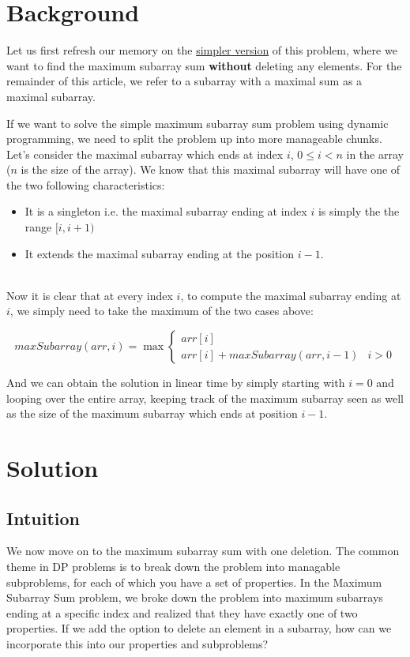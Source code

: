\documentclass{bmcart}
\begin{document}
\section{Background}
Let us first refresh our memory on the \href{https://leetcode.com/problems/maximum-subarray/}{simpler version} of this problem, where we want to find the maximum subarray sum \textbf{without} deleting any elements. For the remainder of this article, we refer to a subarray with a maximal sum as a maximal subarray.

 If we want to solve the simple maximum subarray sum problem using dynamic programming, we need to split the problem up into more manageable chunks. Let's consider the maximal subarray which ends at index $i$, $0 \leq i < n$ in the array ($n$ is the size of the array). We know that this maximal subarray will have one of the two following characteristics:

\begin{itemize}
	\item It is a singleton i.e. the maximal subarray ending at index $i$ is simply the the range $[i, i+1)$
	\item It extends the maximal subarray ending at the position $i-1$. 
\end{itemize}
\ \\
Now it is clear that at every index $i$, to compute the maximal subarray ending at $i$, we simply need to take the maximum of the two cases above: 

\[ maxSubarray(arr, i) = \max{\begin{cases} 
arr[i]\\
arr[i] + maxSubarray(arr, i - 1) & i > 0
\end{cases}}
\]

And we can obtain the solution in linear time by simply starting with $i=0$ and looping over the entire array, keeping track of the maximum subarray seen as well as the size of the maximum subarray which ends at position $i-1$. 




\section{Solution}
\subsection{Intuition}
We now move on to the maximum subarray sum with one deletion. The common theme in DP problems is to break down the problem into managable subproblems, for each of which you have a set of properties. In the Maximum Subarray Sum problem, we broke down the problem into maximum subarrays ending at a specific index and realized that they have exactly one of two properties. If we add the option to delete an element in a subarray, how can we incorporate this into our properties and subproblems?
\end{document}
